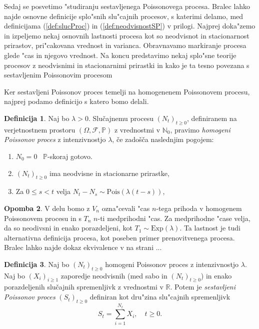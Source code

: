 \documentclass[12pt, a4paper, reqno]{amsart}
\theoremstyle{definition}
\newtheorem{definicija}{Definicija}[section]
\newtheorem{opomba}[definicija]{Opomba}
\theoremstyle{plain}
\newcommand{\N}{\mathbb{N}}
\newcommand{\Prob}{\mathbb{P}}
\newcommand{\1}{\mathds{1}}
\newcommand{\Pois}[1]{\text{Pois}(#1)}
\begin{document}
    Sedaj se posvetimo "studiranju sestavljenega Poissonovega procesa. Bralec lahko najde 
    osnovne definicije splo"snih slu"cajnih procesov, s katerimi delamo,
     med definicijama (\ref{def:slucProc}) in (\ref{def:neodvisnostSP}) v prilogi.
    Najprej doka"zemo in izpeljemo nekaj osnovnih lastnosti procesa kot so neodvisnot in stacionarnost
    prirastov, pri"cakovana vrednost in varianca. Obravnavamo markiranje procesa glede "cas in 
    njegovo vrednost. Na koncu predstavimo nekaj splo"sne teorije procesov z neodvisnimi in 
    stacionarnimi prirastki in kako je ta tesno povezana s sestavljenim Poissonovim procesom 

    Ker sestavljeni Poissonov proces temelji na homogenenem Poissonovem procesu, najprej podamo definicijo 
    s katero bomo delali. 

    \begin{definicija}
        Naj bo $\lambda > 0$. Slučajnemu procesu $(N_t)_{t\geq 0}$, definiranem na verjetnostnem 
        prostoru $(\Omega, \mathcal{F}, \mathbb{P})$ z vrednostmi v $\N_0$, pravimo 
        \textit{homogeni Poissonov proces} z intenzivnostjo $\lambda$, če zadošča naslednjim pogojem:
        \begin{enumerate}
            \item $N_0 = 0$ \ $\Prob$-skoraj gotovo.
            \item $(N_t)_{t\geq 0}$ ima neodvisne in stacionarne prirastke,
            \item Za $0 \leq s < t$ velja $ N_t - N_s \sim\Pois{\lambda(t - s)}$,
        \end{enumerate}
        \label{def:HPP}
    \end{definicija}

    \begin{opomba}
    V delu bomo z $V_n$ ozna"cevali "cas $n$-tega prihoda v homogenem Poissonovem procesu in s $T_n$ $n$-ti 
    medprihodni "cas. Za medprihodne "case velja, da so neodivsni in enako porazdeljeni, kot 
    $T_1 \sim \text{Exp}(\lambda)$. Ta lastnost je tudi alternativna definicija procesa, kot poseben 
    primer prenovitvenega procesa. Bralec 
    lahko najde dokaz ekvivalence v \cite{7} na strani ...
    \end{opomba}

    \begin{definicija}
        Naj bo $(N_t)_{t\geq0}$ homogeni Poissonov proces z intenzivnostjo $\lambda$. 
        Naj bo $(X_i)_{i\geq1}$ zaporedje neodvisnih (med sabo in $(N_t)_{t\geq0}$) in enako 
        porazdeljenih slučajnih spremenljivk z vrednostmi v $\mathbb{R}$. Potem je 
        \textit{sestavljeni Poissonov proces} $(S_t)_{t\geq0}$ definiran kot dru"zina
        slu"cajnih spremenljivk
        $$
            S_t = \sum_{i=1}^{N_t} X_i, \quad t\geq0.
        $$
        \label{def:CPP}
    \end{definicija}
\end{document}
